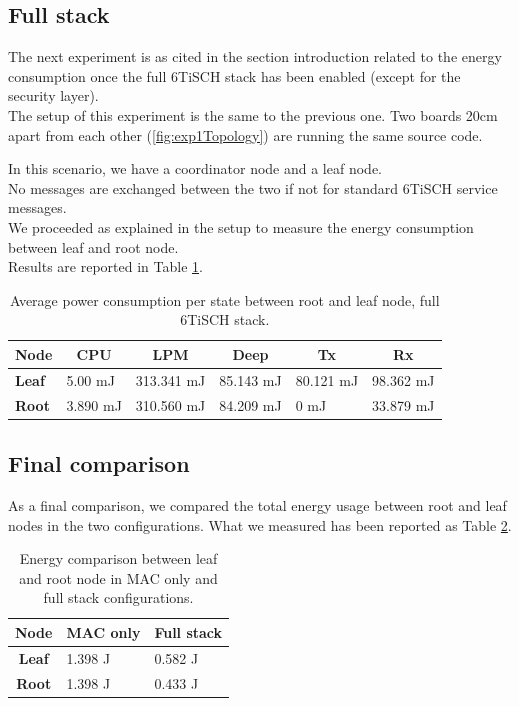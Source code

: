 \documentclass[conference]{IEEEtran}
\begin{document}
\subsection{Full stack}
The next experiment is as cited in the section introduction related to the energy consumption once the full 6TiSCH stack has been enabled (except for the security layer).\\
The setup of this experiment is the same to the previous one.
Two boards 20cm apart from each other (\ref{fig:exp1Topology}) are running the same source code.

In this scenario, we have a coordinator node and a leaf node.\\
No messages are exchanged between the two if not for standard 6TiSCH service messages.\\
We proceeded as explained in the setup to measure the energy consumption between leaf and root node.\\
Results are reported in Table \ref{tab:FullStack}.
\begin{table}[h]
	\centering
	\begin{tabular}{llllll}
		\hline
		\textbf{Node} &
		\multicolumn{1}{c}{\textbf{CPU}} &
		\multicolumn{1}{c}{\textbf{LPM}} &
		\multicolumn{1}{c}{\textbf{Deep}} &
		\multicolumn{1}{c}{\textbf{Tx}} &
		\multicolumn{1}{c}{\textbf{Rx}} \\ \hline
		\textbf{Leaf} &
		5.00 mJ &
		313.341 mJ &
		85.143 mJ &
		80.121 mJ &
		98.362 mJ \\
		\textbf{Root} &
		3.890 mJ &
		310.560 mJ &
		84.209 mJ &
		0 mJ &
		33.879 mJ \\ \hline
	\end{tabular}
	\caption{Average power consumption per state between root and leaf node, full 6TiSCH  stack.}
	\label{tab:FullStack}
\end{table}
\subsection{Final comparison}
As a final comparison, we compared the total energy usage between root and leaf nodes in the two configurations.
What we measured has been reported as Table \ref{tab:exp1Comparison}.
\begin{table}[h]
	\centering
	\begin{tabular}{cll}
		\hline
		\textbf{Node} & \multicolumn{1}{c}{\textbf{MAC only}} & \multicolumn{1}{c}{\textbf{Full stack}} \\ \hline
		\textbf{Leaf} & 1.398 J                                & 0.582 J                                  \\
		\textbf{Root} & 1.398 J                                & 0.433 J                                  \\ \hline
	\end{tabular}
	\caption{Energy comparison between leaf and root node in MAC only and full stack configurations.}
	\label{tab:exp1Comparison}
\end{table}
\end{document}
